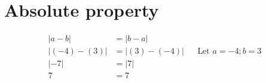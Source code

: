 \documentclass[12pt]{article}
\begin{document}
\section*{Absolute property}

\begin{align*}
    |a-b|      & = |b-a|                                      \\
    |(-4)-(3)| & = |(3)-(-4)| &  & \text{Let $a = -4; b = 3$} \\
    |-7|       & = |7|                                        \\
    7          & =7
\end{align*}
\end{document}

